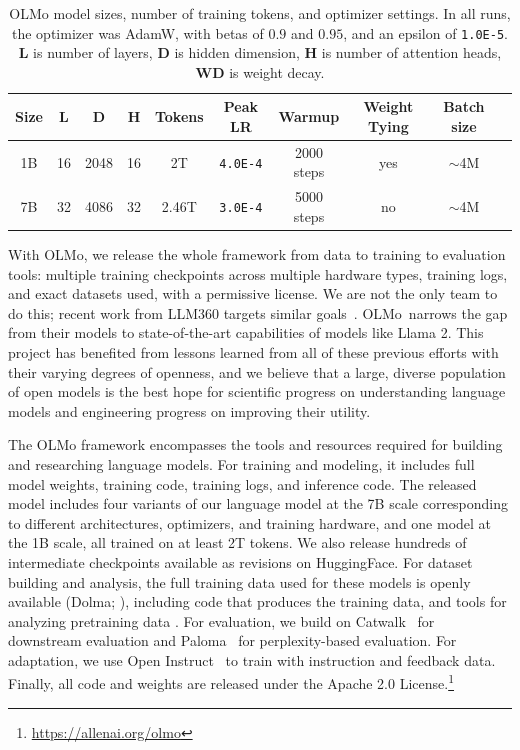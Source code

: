 \documentclass[11pt]{article}
\newcommand{\olmo}{OLMo\xspace}
\begin{document}
\begin{table}[t]
    \centering
    \begin{tabular}{c|cccc|ccccc}
        \toprule
        \textbf{Size} & \textbf{L} & \textbf{D} & \textbf{H} & \textbf{Tokens} & \textbf{Peak LR} & \textbf{Warmup} & \textbf{Weight Tying} & \textbf{Batch size} \\
        \hline
        1B & 16 & 2048 & 16 & 2T & \texttt{4.0E-4} & 2000 steps & yes & $\sim$4M \\
        7B & 32 & 4086 & 32 & 2.46T & \texttt{3.0E-4} & 5000 steps & no & $\sim$4M \\
        \bottomrule
    \end{tabular}
    \caption{\olmo model sizes, number of training tokens, and optimizer settings. In all runs, the optimizer was AdamW, with betas of $0.9$ and $0.95$, and an epsilon of \texttt{1.0E-5}.
    \textbf{L} is number of layers, \textbf{D} is hidden dimension, \textbf{H} is number of attention heads, \textbf{WD} is weight decay. 
    }
    \label{tab:model_size_and_optimizer}
\end{table}

With \olmo, we release the whole framework from data to training to evaluation tools: multiple training checkpoints across multiple hardware types, training logs, and exact datasets used, with a permissive license.
We are not the only team to do this; recent work from LLM360 targets similar goals~\citep{liu2023llm360}.
\olmo~narrows the gap from their models to state-of-the-art capabilities of models like Llama 2. This project has benefited from lessons learned from all of these previous efforts with their varying degrees of openness, and we believe that a large, diverse population of open models is the best hope for scientific progress on understanding language models and engineering progress on improving their utility.

The \olmo framework encompasses the tools and resources required for building and researching language models. For training and modeling, it includes 
full model weights, training code, 
training logs, and inference code. The released model includes four variants of our language model at the 7B scale corresponding to different architectures, optimizers, and training hardware, and one model at the 1B scale, all trained on at least 2T tokens. We also release hundreds of intermediate checkpoints available as revisions on HuggingFace.
For dataset building and analysis, the full training data used for these models is openly available (Dolma; \citealp{dolma}), including code that produces the training data, and tools for analyzing pretraining data  \citep{wimbd}. 
For evaluation, we build on Catwalk~\citep{groeneveld2023catwalk} for downstream evaluation and Paloma~\citep{magnusson2023paloma} for perplexity-based evaluation.
For adaptation, we use Open Instruct~\citep{ivison2023camels,wang2023far} to train with instruction and feedback data. 
Finally, all code and weights are released under the Apache 2.0 License.\footnote{\url{https://allenai.org/olmo}}
\end{document}
